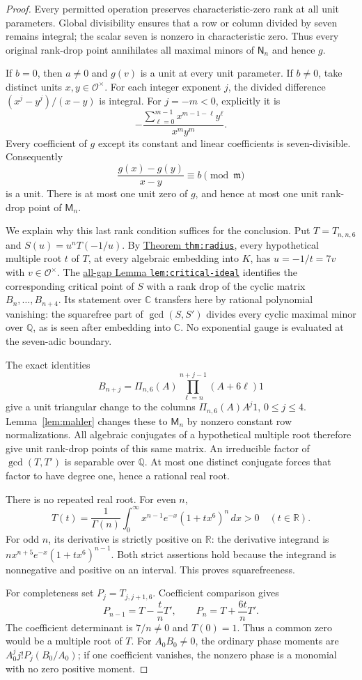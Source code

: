 \documentclass[11pt]{article}
\begin{document}
\begin{proof}
Every permitted operation preserves characteristic-zero rank at
all unit parameters. Global divisibility ensures that a row or
column divided by seven remains integral; the scalar seven is
nonzero in characteristic zero. Thus every original rank-drop
point annihilates all maximal minors of $\mathsf N_n$ and hence $g$.

If $b=0$, then $a\ne0$ and $g(v)$ is a unit at every unit parameter.
If $b\ne0$, take distinct units $x,y\in\mathcal O^\times$.
For each integer exponent $j$, the divided difference
$(x^j-y^j)/(x-y)$ is integral. For $j=-m<0$, explicitly it is
\[
 -\frac{\sum_{\ell=0}^{m-1}x^{m-1-\ell}y^\ell}{x^my^m}.
\]
Every coefficient of $g$ except its constant and linear
coefficients is seven-divisible. Consequently
\[
 \frac{g(x)-g(y)}{x-y}\equiv b\pmod{\mathfrak m}
\]
is a unit. There is at most one unit zero of $g$, and hence
at most one unit rank-drop point of $\mathsf M_n$.

We explain why this last rank condition suffices for the conclusion.
Put $T=T_{n,n,6}$ and $S(u)=u^nT(-1/u)$.
By \href{PHYSICAL_PRIME_TOTAL_DEGREE_REDUCTION.tex}
{Theorem \texttt{thm:radius}}, every hypothetical multiple root
$t$ of $T$, at every algebraic embedding into $K$, has
$u=-1/t=7v$ with $v\in\mathcal O^\times$.
The \href{gap_three_hurwitz_structure.tex}
{all-gap Lemma \texttt{lem:critical-ideal}} identifies the corresponding
critical point of $S$ with a rank drop of the cyclic matrix
$B_n,\ldots,B_{n+4}$. Its statement over $\mathbb C$ transfers
here by rational polynomial vanishing: the squarefree part of
$\gcd(S,S')$ divides every cyclic maximal minor over $\mathbb Q$,
as is seen after embedding into $\mathbb C$.
No exponential gauge is evaluated at the seven-adic boundary.

The exact identities
\[
 B_{n+j}=\Pi_{n,6}(A)\prod_{\ell=n}^{n+j-1}(A+6\ell)1
\]
give a unit triangular change to the columns
$\Pi_{n,6}(A)A^j1$, $0\le j\le4$.
Lemma~\ref{lem:mahler} changes these to $\mathsf M_n$ by
nonzero constant row normalizations.
All algebraic conjugates of a hypothetical multiple root therefore
give unit rank-drop points of this same matrix.
An irreducible factor of $\gcd(T,T')$ is separable over $\mathbb Q$.
At most one distinct conjugate forces that factor to have degree
one, hence a rational real root.

There is no repeated real root. For even $n$,
\[
 T(t)=\frac1{\Gamma(n)}
       \int_0^\infty x^{n-1}e^{-x}(1+tx^6)^n\,dx>0
       \quad(t\in\mathbb R).
\]
For odd $n$, its derivative is strictly positive on $\mathbb R$:
the derivative integrand is
$n x^{n+5}e^{-x}(1+tx^6)^{n-1}$.
Both strict assertions hold because the integrand is nonnegative
and positive on an interval.
This proves squarefreeness.

For completeness set $P_j=T_{j,j+1,6}$.
Coefficient comparison gives
\[
 P_{n-1}=T-\frac tnT',\qquad
 P_n=T+\frac{6t}{n}T'.
\]
The coefficient determinant is $7/n\ne0$ and $T(0)=1$.
Thus a common zero would be a multiple root of $T$.
For $A_0B_0\ne0$, the ordinary phase moments are
$A_0^j j!P_j(B_0/A_0)$; if one coefficient vanishes,
the nonzero phase is a monomial with no zero positive moment.
\end{proof}
\end{document}
